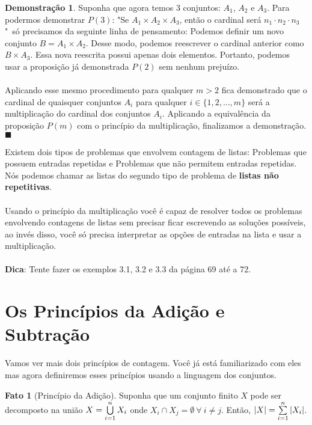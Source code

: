 \documentclass[a4paper,11pt]{book}
\theoremstyle{definition}
\theoremstyle{break}
\newtheorem{fact}{Fato}[section]
\newtheorem{demonstration}{Demonstração}[section]
\begin{document}
\begin{demonstration}
Suponha que agora temos 3 conjuntos: $A_1$, $A_2$ e $A_3$. Para podermos demonstrar $P(3)$: "Se $A_1 \times A_2 \times A_3$, então o cardinal será  $n_1 \cdot n_2 \cdot n_3$"\  só precisamos da seguinte linha de pensamento: Podemos definir um novo conjunto $B = A_1 \times A_2$. Desse modo, podemos reescrever o cardinal anterior como $B \times A_3$. Essa nova reescrita possui apenas dois elementos. Portanto, podemos usar a proposição já demonstrada $P(2)$ sem nenhum prejuízo.
\\
\\
Aplicando esse mesmo procedimento para qualquer $m > 2$ fica demonstrado que o cardinal de quaisquer conjuntos $A_i$ para qualquer $i \in \{1,2,\dots,m\}$ será a multiplicação do cardinal dos conjuntos $A_i$. Aplicando a equivalência da proposição $P(m)$ com o princípio da multiplicação, finalizamos a demonstração. $\blacksquare$
\end{demonstration}

Existem dois tipos de problemas que envolvem contagem de listas: Problemas que possuem entradas repetidas e Problemas que não permitem entradas repetidas. Nós podemos chamar as listas do segundo tipo de problema de \textbf{listas não repetitivas}.
\\
\\
Usando o princípio da multiplicação você é capaz de resolver todos os problemas envolvendo contagens de listas sem precisar ficar escrevendo as soluções possíveis, ao invés disso, você só precisa interpretar as opções de entradas na lista e usar a multiplicação.
\\
\\
\textbf{Dica}: Tente fazer os exemplos 3.1, 3.2 e 3.3 da página 69 até a 72.

\section{Os Princípios da Adição e Subtração}

Vamos ver mais dois princípios de contagem. Você já está familiarizado com eles mas agora definiremos esses princípios usando a linguagem dos conjuntos.

\begin{fact}[Princípio da Adição]
Suponha que um conjunto finito $X$ pode ser decomposto na união $X = \bigcup_{i = 1}^{n}\limits X_i$ onde $ X_i \cap X_j = \emptyset \ \forall \ i \neq j$. Então, $|X| = \sum_{i = 1}^{n}\limits |X_i|$.
\end{fact}
\end{document}
